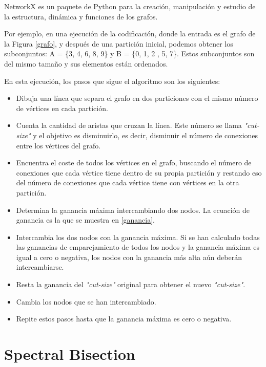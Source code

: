 \begin{mydef}\label{NetworkX}
	NetworkX es un paquete de Python para la creación, manipulación y estudio de la estructura, dinámica y funciones de los grafos. 
\end{mydef}

Por ejemplo, en una ejecución de la codificación, donde la entrada es el grafo de la Figura \ref{grafo}, y después de una partición inicial, podemos obtener los subconjuntos: A = \{3, 4, 6, 8, 9\} y B = \{0, 1, 2 , 5, 7\}. Estos subconjuntos son del mismo tamaño y sus elementos están ordenados.

En esta ejecución, los pasos que sigue el algoritmo son los siguientes:

\begin{itemize}
	\item Dibuja una línea que separa el grafo en dos particiones con el mismo número de vértices en cada partición.
	\item Cuenta la cantidad de aristas que cruzan la línea. Este número se llama \textit{"cut-size"} y el objetivo es disminuirlo, es decir, disminuir el número de conexiones entre los vértices del grafo.
	\item Encuentra el coste de todos los vértices en el grafo, buscando el número de conexiones que cada vértice tiene dentro de su propia partición y restando eso del número de conexiones que cada vértice tiene con vértices en la otra partición.
	\item Determina la ganancia máxima intercambiando dos nodos. La ecuación de ganancia es la que se muestra en \ref{ganancia}.
	\item Intercambia los dos nodos con la ganancia máxima. Si se han calculado todas las ganancias de emparejamiento de todos los nodos y la ganancia máxima es igual a cero o negativa, los nodos con la ganancia más alta aún deberán intercambiarse.
	\item Resta la ganancia del \textit{"cut-size"} original para obtener el nuevo \textit{"cut-size"}.
	\item Cambia los nodos que se han intercambiado.
	\item Repite estos pasos hasta que la ganancia máxima es cero o negativa.
\end{itemize}

\newpage
\section{Spectral Bisection}\label{Spectral-Bisection}

